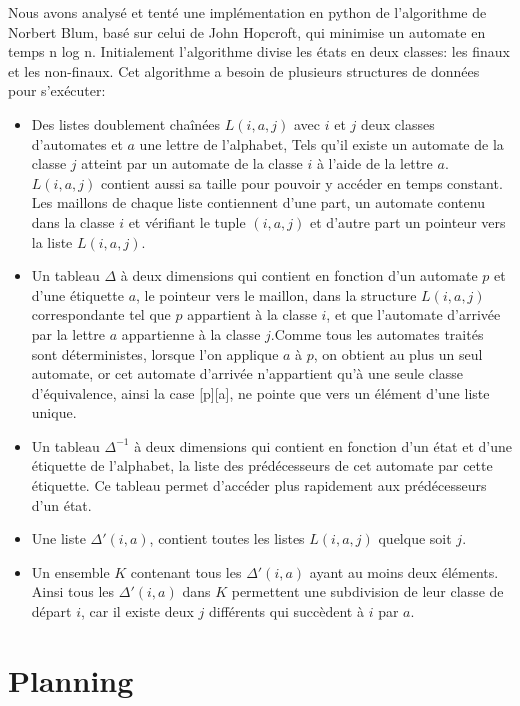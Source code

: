 \documentclass{article}%
\begin{document}
Nous avons analysé et tenté une implémentation en python de l'algorithme de Norbert Blum, basé sur celui de John Hopcroft, qui minimise un automate en temps n log n. 
Initialement l'algorithme divise les états en deux classes: les finaux et les non-finaux. Cet algorithme a besoin de plusieurs structures de données pour s'exécuter: 
\begin{itemize} 
\item Des listes doublement chaînées $L(i,a,j)$ avec $i$ et $j$ deux classes d'automates et $a$ une lettre de l'alphabet, Tels qu'il existe un automate de la classe $j$ atteint par un automate de la classe $i$ à l'aide de la lettre $a$. $L(i,a,j)$ contient aussi sa taille pour pouvoir y accéder en temps constant.  Les maillons de chaque liste contiennent d'une part, un automate contenu dans la classe $i$ et vérifiant le tuple $(i,a,j)$ et d'autre part un pointeur vers la liste $L(i,a,j)$.
\item Un tableau $\Delta$ à deux dimensions qui contient en fonction d'un automate $p$ et d'une étiquette $a$, le pointeur vers le maillon, dans la structure $L(i,a,j)$ correspondante tel que $p$ appartient à la classe $i$, et que l'automate d'arrivée par la lettre $a$ appartienne à la classe $j$.Comme tous les automates traités sont déterministes, lorsque l'on applique $a$ à $p$, on obtient au plus un seul automate, or cet automate d'arrivée n'appartient qu'à une seule classe d'équivalence, ainsi la case [p][a], ne pointe que vers un élément d'une liste unique.   
\item Un tableau $\Delta^{-1}$ à deux dimensions qui contient en fonction d'un état et d'une étiquette de l'alphabet, la liste des prédécesseurs de cet automate par cette étiquette.
Ce tableau permet d'accéder plus rapidement aux prédécesseurs d'un état.
\item Une liste $\Delta'(i,a)$, contient toutes les listes $L(i,a,j)$ quelque soit $j$.
\item Un ensemble $K$ contenant tous les $\Delta'(i,a)$ ayant au moins deux éléments. Ainsi tous les $\Delta'(i,a)$ dans $K$ permettent une subdivision de leur classe de départ $i$, car il existe deux $j$ différents qui succèdent à $i$ par $a$. 
\end{itemize} 


\section{Planning}
\end{document}

